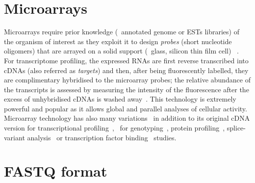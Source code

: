 \vspace{-3mm}
\section{Microarrays}\label{sec:microarray}
\vspace{-5mm}
Microarrays require prior knowledge
(\eg\ annotated genome or \glspl{EST} libraries)
of the organism of interest
as they exploit it to design \emph{probes} (short nucleotide oligomers)
that are arrayed on a solid support (\eg\ glass, silicon thin film cell)%
~.
For transcriptome profiling,
the expressed \glspl{RNA} are first reverse transcribed into \glspl{cDNA}
(also referred as \emph{targets})
and then, after being fluorescently labelled, they are complimentary hybridised
to the microarray probes;
the relative abundance of the transcripts is assessed
by measuring the intensity of the fluorescence
after the excess of unhybridised \glspl{cDNA} is washed away~.
This technology is extremely powerful and popular
as it allows global and parallel analyses of cellular activity.
Microarray technology has also many variations~
in addition to its original \gls{cDNA} version
for transcriptional profiling~, \eg\
for genotyping~,
protein profiling~,
splice-variant analysis~\mycite{Cuperlovic-Culf2006-rg} or
transcription factor binding~ studies.

\clearpage
\section{FASTQ format}\label{sec:fastq-format}

